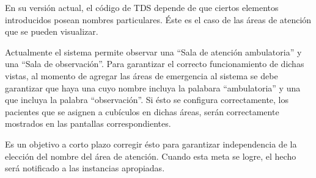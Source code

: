 \documentclass[9pt, letterpaper, oneside]{report}
\begin{document}
    En su versión actual, el código de TDS depende de que ciertos elementos
    introducidos posean nombres particulares. Éste es el caso de las áreas de
    atención que se pueden visualizar.

    Actualmente el sistema permite observar una ``Sala de atención ambulatoria''
    y una ``Sala de observación''. Para garantizar el correcto funcionamiento de
    dichas vistas, al momento de agregar las áreas de emergencia al sistema se
    debe garantizar que haya una cuyo nombre incluya la palabara ``ambulatoria''
    y una que incluya la palabra ``observación''. Si ésto se configura
    correctamente, los pacientes que se asignen a cubículos en dichas áreas,
    serán correctamente mostrados en las pantallas correspondientes.

    Es un objetivo a corto plazo corregir ésto para garantizar independencia de
    la elección del nombre del área de atención. Cuando esta meta se logre, el
    hecho será notificado a las instancias apropiadas.
\end{document}
